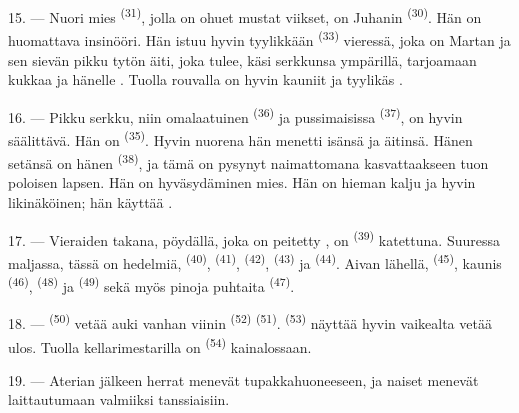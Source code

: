15. --- Nuori mies  \textsuperscript{(31)}, jolla on ohuet
mustat viikset, on Juhanin  \textsuperscript{(30)}. Hän on
huomattava insinööri. Hän istuu hyvin tyylikkään 
\textsuperscript{(33)} vieressä, joka on Martan  ja sen
sievän pikku tytön äiti, joka tulee, käsi serkkunsa ympärillä, tarjoamaan kukkaa
ja  hänelle . Tuolla rouvalla on hyvin
kauniit  ja tyylikäs .

16. --- Pikku serkku, niin omalaatuinen 
\textsuperscript{(36)} ja pussimaisissa 
\textsuperscript{(37)}, on hyvin säälittävä. Hän on 
\textsuperscript{(35)}. Hyvin nuorena hän menetti isänsä ja äitinsä. Hänen
setänsä on hänen  \textsuperscript{(38)}, ja tämä on pysynyt
naimattomana kasvattaakseen tuon poloisen lapsen. Hän on hyväsydäminen mies. Hän
on hieman kalju ja hyvin likinäköinen; hän käyttää .

\VUsaut{2.4mm}
\VUsaut{3.0mm}

17. --- Vieraiden takana, pöydällä, joka on peitetty , on
 \textsuperscript{(39)} katettuna. Suuressa maljassa, tässä on
hedelmiä,  \textsuperscript{(40)}, 
\textsuperscript{(41)},  \textsuperscript{(42)},
 \textsuperscript{(43)} ja 
\textsuperscript{(44)}. Aivan lähellä, 
\textsuperscript{(45)}, kaunis  \textsuperscript{(46)},
 \textsuperscript{(48)} ja 
\textsuperscript{(49)} sekä myös pinoja puhtaita 
\textsuperscript{(47)}.

18. ---  \textsuperscript{(50)} vetää auki vanhan viinin
 \textsuperscript{(52)} 
\textsuperscript{(51)}.  \textsuperscript{(53)} näyttää hyvin
vaikealta vetää ulos. Tuolla kellarimestarilla on 
\textsuperscript{(54)} kainalossaan.

19. --- Aterian jälkeen herrat menevät tupakkahuoneeseen, ja naiset menevät
laittautumaan valmiiksi tanssiaisiin.

\VUsaut{5.0mm}
\VUsaut{1.6mm}
\VUsaut{2.6mm}

